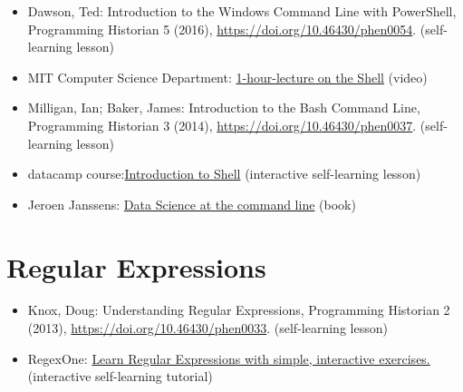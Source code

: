 \documentclass[
  letterpaper,
]{book}
\begin{document}
\begin{itemize}
\item
  Dawson, Ted: Introduction to the Windows Command Line with PowerShell,
  Programming Historian 5 (2016),
  \url{https://doi.org/10.46430/phen0054}. (self-learning lesson)
\item
  MIT Computer Science Department:
  \href{https://missing.csail.mit.edu/2020/course-shell/}{1-hour-lecture
  on the Shell} (video)
\item
  Milligan, Ian; Baker, James: Introduction to the Bash Command Line,
  Programming Historian 3 (2014),
  \url{https://doi.org/10.46430/phen0037}. (self-learning lesson)
\item
  datacamp
  course:\href{https://app.datacamp.com/learn/courses/introduction-to-shell}{Introduction
  to Shell} (interactive self-learning lesson)
\item
  Jeroen Janssens: \href{https://datascienceatthecommandline.com/}{Data
  Science at the command line} (book)
\end{itemize}

\hypertarget{regular-expressions}{%
\section{Regular Expressions}\label{regular-expressions}}

\begin{itemize}
\item
  Knox, Doug: Understanding Regular Expressions, Programming Historian 2
  (2013), \url{https://doi.org/10.46430/phen0033}. (self-learning
  lesson)
\item
  RegexOne: \href{https://regexone.com/}{Learn Regular Expressions with
  simple, interactive exercises.} (interactive self-learning tutorial)
\end{itemize}
\end{document}

